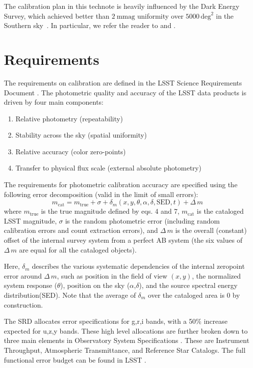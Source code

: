 \documentclass[SE,authoryear,lsstdraft,toc]{lsstdoc}
\newcommand{\mcat}{m_{\mathrm{cat}}}
\newcommand{\mtrue}{m_{\mathrm{true}}}
\newcommand{\deltam}{\delta_m}
\newcommand{\Deltam}{\Delta\,m}
\begin{document}
The calibration plan in this technote is heavily influenced by the Dark Energy Survey, which achieved better than $2~\mathrm{mmag}$ uniformity over $5000\,\mathrm{deg}^2$ in the Southern sky~\citep{2023arXiv230501695R}.
In particular, we refer the reader to \citet[henceforth B17]{2017PASP..129k4502B} and \citet[henceforth BR18]{2018AJ....155...41B}.

\section{Requirements}

The requirements on calibration are defined in the LSST Science Requirements
Document . The photometric quality and accuracy of the LSST data
products is driven by four main components:
\begin{enumerate}
    \item Relative photometry (repeatability)
    \item Stability across the sky (spatial uniformity)
    \item Relative accuracy (color zero-points)
    \item Transfer to physical flux scale (external absolute photometry)
\end{enumerate}

The requirements for photometric calibration accuracy are specified using the
following error decomposition (valid in the limit of small errors):
%
\begin{equation}
    \mcat = \mtrue +\sigma+\deltam (x,y,\theta,\alpha,\delta,\mathrm{SED},t)+\Deltam
\end{equation}
%
where $\mtrue$ is the true magnitude defined by eqs. 4 and 7, $\mcat$ is the
cataloged LSST magnitude, $\sigma$ is the random photometric error (including
random calibration errors and count extraction errors), and $\Deltam$ is the
overall (constant) offset of the internal survey system from a perfect AB
system (the six values of $\Deltam$ are equal for all the cataloged objects).

Here, $\deltam$ describes the various systematic dependencies of the internal
zeropoint error around $\Deltam$, such as position in the field of view $(x,
y)$, the normalized system response ($\theta$), position on the sky
($\alpha$,$\delta$), and the source spectral energy distribution(SED).  Note
that the average of $\deltam$ over the cataloged area is 0 by construction.

The SRD allocates error specifications for g,r,i bands, with a 50\% increase
expected for u,z,y bands. These high level allocations are further broken
down to three main elements in Observatory System Specifications
. These are Instrument Throughput, Atmospheric Transmittance, and
Reference Star Catalogs. The full functional error budget can be found in LSST
.
\end{document}
